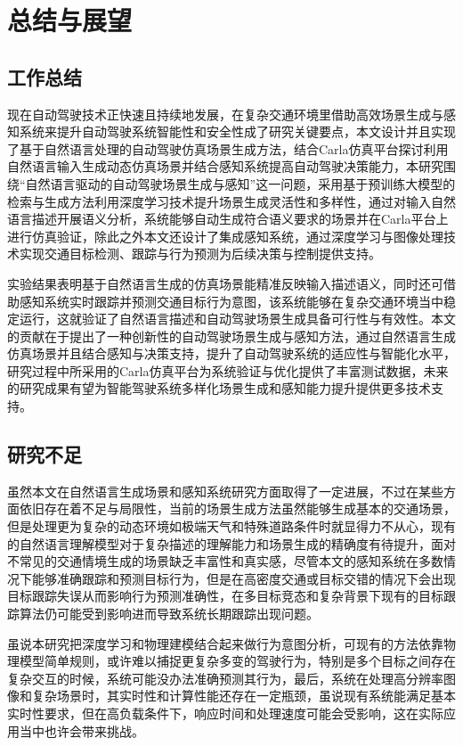 \chapter{总结与展望}

\section{工作总结}

现在自动驾驶技术正快速且持续地发展，在复杂交通环境里借助高效场景生成与感知系统来提升自动驾驶系统智能性和安全性成了研究关键要点，本文设计并且实现了基于自然语言处理的自动驾驶仿真场景生成方法，结合Carla仿真平台探讨利用自然语言输入生成动态仿真场景并结合感知系统提高自动驾驶决策能力，本研究围绕“自然语言驱动的自动驾驶场景生成与感知”这一问题，采用基于预训练大模型的检索与生成方法利用深度学习技术提升场景生成灵活性和多样性，通过对输入自然语言描述开展语义分析，系统能够自动生成符合语义要求的场景并在Carla平台上进行仿真验证，除此之外本文还设计了集成感知系统，通过深度学习与图像处理技术实现交通目标检测、跟踪与行为预测为后续决策与控制提供支持。

实验结果表明基于自然语言生成的仿真场景能精准反映输入描述语义，同时还可借助感知系统实时跟踪并预测交通目标行为意图，该系统能够在复杂交通环境当中稳定运行，这就验证了自然语言描述和自动驾驶场景生成具备可行性与有效性。本文的贡献在于提出了一种创新性的自动驾驶场景生成与感知方法，通过自然语言生成仿真场景并且结合感知与决策支持，提升了自动驾驶系统的适应性与智能化水平，研究过程中所采用的Carla仿真平台为系统验证与优化提供了丰富测试数据，未来的研究成果有望为智能驾驶系统多样化场景生成和感知能力提升提供更多技术支持。

\section{研究不足}
虽然本文在自然语言生成场景和感知系统研究方面取得了一定进展，不过在某些方面依旧存在着不足与局限性，当前的场景生成方法虽然能够生成基本的交通场景，但是处理更为复杂的动态环境如极端天气和特殊道路条件时就显得力不从心，现有的自然语言理解模型对于复杂描述的理解能力和场景生成的精确度有待提升，面对不常见的交通情境生成的场景缺乏丰富性和真实感，尽管本文的感知系统在多数情况下能够准确跟踪和预测目标行为，但是在高密度交通或目标交错的情况下会出现目标跟踪失误从而影响行为预测准确性，在多目标竞态和复杂背景下现有的目标跟踪算法仍可能受到影响进而导致系统长期跟踪出现问题。


虽说本研究把深度学习和物理建模结合起来做行为意图分析，可现有的方法依靠物理模型简单规则，或许难以捕捉更复杂多变的驾驶行为，特别是多个目标之间存在复杂交互的时候，系统可能没办法准确预测其行为，最后，系统在处理高分辨率图像和复杂场景时，其实时性和计算性能还存在一定瓶颈，虽说现有系统能满足基本实时性要求，但在高负载条件下，响应时间和处理速度可能会受影响，这在实际应用当中也许会带来挑战。

